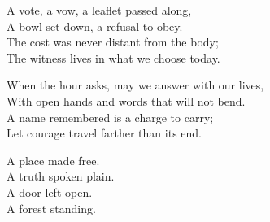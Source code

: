 \begin{lyrics}
A vote, a vow, a leaflet passed along,\\
A bowl set down, a refusal to obey.\\
The cost was never distant from the body;\\
The witness lives in what we choose today.

When the hour asks, may we answer with our lives,\\
With open hands and words that will not bend.\\
A name remembered is a charge to carry;\\
Let courage travel farther than its end.

A place made free.\\
A truth spoken plain.\\
A door left open.\\
A forest standing.
\end{lyrics}

